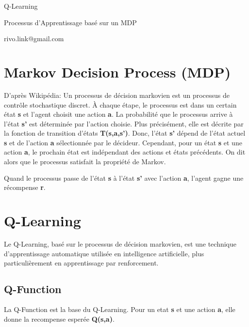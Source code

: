 \documentclass{article}
\begin{document}
\vspace*{\fill}
\begingroup
\centering

Q-Learning

\vspace{3mm}
Processus d'Apprentissage basé sur un MDP

\vspace{5mm} 
rivo.link@gmail.com

\endgroup
\vspace*{\fill}

\newpage

\section{Markov Decision Process (MDP)}

D'après Wikipédia: Un processus de décision markovien est un processus de contrôle stochastique discret. À chaque étape, le processus est dans un certain état \textbf{s} et l'agent choisit une action \textbf{a}. La probabilité que le processus arrive à l'état \textbf{s'} est déterminée par l'action choisie. Plus précisément, elle est décrite par la fonction de transition d'états \textbf{T(s,a,s')}. Donc, l'état \textbf{s'} dépend de l'état actuel \textbf{s} et de l'action \textbf{a} sélectionnée par le décideur. Cependant, pour un état \textbf{s} et une action \textbf{a}, le prochain état est indépendant des actions et états précédents. On dit alors que le processus satisfait la propriété de Markov. 
\newline

Quand le processus passe de l'état \textbf{s} à l'état \textbf{s'} avec l'action \textbf{a}, l'agent gagne une récompense \textbf{r}. 

\section{Q-Learning}

Le Q-Learning, basé sur le processus de décision markovien, est une technique d'apprentissage automatique utilisée en intelligence artificielle, plus particulièrement en apprentissage par renforcement.

\subsection{Q-Function}

La Q-Function est la base du Q-Learning. Pour un etat \textbf{s} et une action \textbf{a}, elle donne la recompense esperée \textbf{Q(s,a)}.
\end{document}
